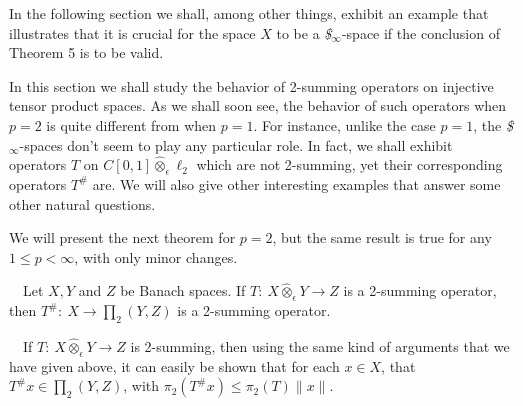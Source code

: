 In the following
section we shall, among other things, exhibit an example that 
illustrates that it
is crucial for the space $X$ to be a {\it \$}$_\infty$-space if the 
conclusion of
Theorem 5 is to be valid. 

\bigskip


In this section we shall study the behavior of 2-summing operators on
injective tensor product spaces.  As we shall soon see, the behavior 
of
such operators when $p=2$ is quite different from when $p=1$.  For
instance, unlike the case $p=1$, the {\it \$}$_\infty$-spaces don't 
seem to play
any particular role.  In fact, we shall exhibit operators $T$ on 
$C[0,1]\hat
\otimes_\epsilon \ell_2$ which are not 2-summing, yet their
corresponding operators $T^\#$ are.  We will also give other
interesting examples that answer some other natural questions.

\medskip

We will present the next theorem for $p=2$, but the same result is 
true for any
$1\leq p<\infty$, with only minor changes.

\medskip

\ \ Let $X,Y$ and $Z$ be Banach spaces.  If
$T:\ X\hat \otimes_\epsilon Y\longrightarrow Z$ is a 2-summing 
operator,
then $T^\#:\ X\longrightarrow \prod_2 (Y,Z)$ is a 2-summing operator.

\medskip

\ \ If $T:\ X\hat \otimes_\epsilon
Y\longrightarrow Z$ is 2-summing, then using the same kind of 
arguments that we
have given above, it can easily be shown that for each $x\in X$, that 
$T^\#x\in
\prod_2(Y,Z)$, with $\pi_2(T^\#x)\leq \pi_2(T)\parallel x\parallel$.

